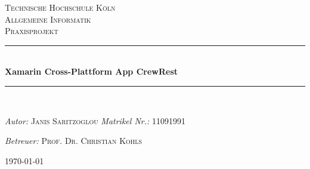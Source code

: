 \begin{titlepage}
\newcommand{\HRule}{\rule{\linewidth}{0.5mm}}
\center
\textsc{\LARGE Technische Hochschule Köln} \\[1.5cm]
\textsc{\Large Allgemeine Informatik} \\[0.5cm]
\textsc{\large Praxisprojekt} \\
\HRule  \\[0.4cm]
{ \huge \bfseries Xamarin Cross-Plattform App CrewRest} \\[0.4cm]
\HRule  \\[1.5cm]
\vfill
\begin{minipage}[t]{0.4\textwidth}
    \begin{flushleft} \large
        \emph{Autor:} \newline
        \textsc{Janis Saritzoglou}
        \newline
        \emph{Matrikel Nr.:}
        \textsc{11091991}
    \end{flushleft}
\end{minipage}
\hfill
\begin{minipage}[t]{0.5\textwidth}
    \begin{flushright} \large
        \begin{flushleft}
            \emph{Betreuer:} \newline
            \textsc{Prof. Dr. Christian Kohls}
    \end{flushleft}
    \end{flushright}
\end{minipage}
\vfill
{\large \today}
\end{titlepage}
